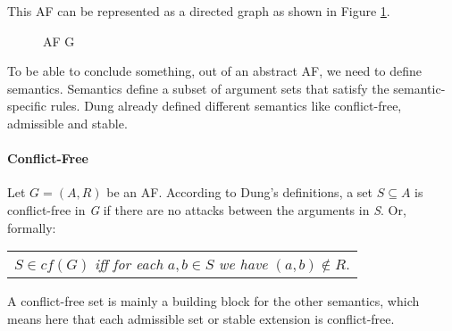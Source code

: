 This AF can be represented as a directed graph as shown in Figure \ref{af:backgroundAFexample1}.
\begin{figure}[h]
    \centering
    \caption{\ac{AF} G}
    \label{af:backgroundAFexample1}
\end{figure}

To be able to conclude something, out of an abstract AF, we need to define semantics. Semantics define a subset of argument sets that satisfy the semantic-specific rules. Dung already defined different semantics \cite{Dung1995-DUNOTA-2} like conflict-free, admissible and stable.

\paragraph{Conflict-Free} Let $G=(A,R)$ be an AF. According to Dung's definitions, a set $S \subseteq A$ is conflict-free in \textit{G} if there are no attacks between the arguments in \textit{S}. Or, formally:

\begin{center}
    \begin{tabular}{c}
        $S \in cf(G)$ \textit{iff for each} $a, b \in S$ \textit{we have} $(a, b) \not\in R$.
    \end{tabular}
\end{center}

A conflict-free set is mainly a building block for the other semantics, which means here that each admissible set or stable extension is conflict-free.


